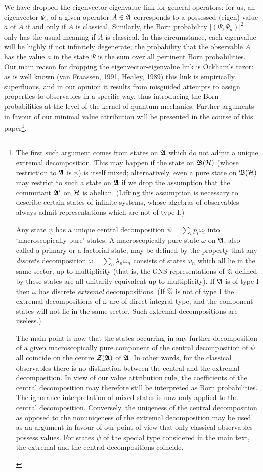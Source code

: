 \documentclass[12pt,titlepage]{article}
\newcommand{\lm}{\lambda}
\newcommand{\ps}{\psi}
\newcommand{\om}{\omega}
\newcommand{\A}{\frak A}
\newcommand{\B}{\frak B}
\renewcommand{\H}{\mbox{$\cal H$}}
\renewcommand{\ll}{\label}
\newcommand{\fn}{\footnote}
\renewcommand{\sp}{\samepage}
\newcommand{\Z}{{\cal Z}}
\begin{document}
 We have dropped the eigenvector-eigenvalue
link for general operators: for us, an eigenvector $\Psi_{a}$ of a given
operator $A\in\A$ corresponds
to a  possessed  (eigen) value $a$ of $A$ if and only if $A$ is classical.
Similarly, the Born
probability  $|(\Psi,\Psi_{a})|^2$  only has the usual meaning   if $A$ is
classical. In this circumstance,
each eigenvalue will be highly if not infinitely degenerate;   the probability
that the
observable $A$ has the value $a$ in the state $\Psi$ is the sum over all
pertinent Born
probabilities.
Our main reason for dropping the eigenvector-eigenvalue
link
 is Ockham's razor: as is well known (van Fraassen, 1991,
Healey, 1989) this link is empirically superfluous, and in our opinion it
results from misguided
attempts to assign properties to observables in a specific way, thus
introducing
the Born probabilities at the level of the
kernel of quantum mechanics. Further arguments in favour of our minimal value
attribution will be
presented in the course of this paper\fn{{\sp The first such argument comes
from states on $\A$ which
do not admit  a unique extremal decomposition. This may happen if the state on
$\B(\H)$ (whose
restriction to $\A$ is $\ps$) is itself mixed; alternatively, even a pure state
on $\B(\H)$
may restrict to such a  state on $\A$ if we drop the assumption that the
commutant $\A'$ on $\H$ is
abelian. (Lifting this assumption is necessary to describe certain states of
infinite systems, whose
algebras of observables always admit  representations which are not of type I.)

Any state $\ps$ has a unique
central decomposition $\ps=\sum_i p_i\om_i$ into `macroscopically pure' states.
 A macroscopically
pure state $\om$ on $\A$, also called a primary or a factorial state, may be
defined by the property
that any {\em discrete} decomposition  $\om=\sum_n \lm_n\om_n$ consists of
states $\om_n$ which all
lie in the same sector, up to multiplicity (that is, the GNS representations of
$\A$ defined by these
states are all unitarily equivalent up to multiplicity). If $\A$ is of type I
then $\om$ has discrete
{\em extremal} decompositions. (If $\A$ is not of type I the extremal
decompositions of $\om$ are of
direct integral type, and the component states will not lie in the same sector.
Such extremal
decompositions are useless.)

The main point is now that  the states occurring in any further decomposition
of a given
macroscopically pure component of the central decomposition of $\ps$ all
coincide on the centre
$\Z(\A)$ of $\A$. In other words, for the classical observables there is no
distinction between the
central and the extremal decomposition.
 In view of our value
attribution rule, the coefficients of the  central decomposition may therefore
still be
interpreted as Born probabilities. The ignorance interpretation of mixed states
is now only
applied to the central decomposition. Conversely, the uniqeness of the central
decomposition as
opposed to the nonuniqeness of the extremal decomposition may be used as an
argument in favour of
our point of view that only classical observables possess values. For states
$\ps$ of the special type
considered in the main text, the extremal and the central decompositions
coincide.}\ll{gen}}.
\end{document}
